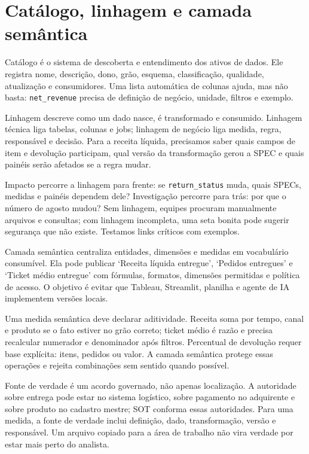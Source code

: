 \section{Catálogo, linhagem e camada semântica}

Catálogo é o sistema de descoberta e entendimento dos ativos de dados. Ele registra nome, descrição, dono, grão, esquema, classificação, qualidade, atualização e consumidores. Uma lista automática de colunas ajuda, mas não basta: \texttt{net\_revenue} precisa de definição de negócio, unidade, filtros e exemplo.

Linhagem descreve como um dado nasce, é transformado e consumido. Linhagem técnica liga tabelas, colunas e jobs; linhagem de negócio liga medida, regra, responsável e decisão. Para a receita líquida, precisamos saber quais campos de item e devolução participam, qual versão da transformação gerou a SPEC e quais painéis serão afetados se a regra mudar.

Impacto percorre a linhagem para frente: se \texttt{return\_status} muda, quais SPECs, medidas e painéis dependem dele? Investigação percorre para trás: por que o número de agosto mudou? Sem linhagem, equipes procuram manualmente arquivos e consultas; com linhagem incompleta, uma seta bonita pode sugerir segurança que não existe. Testamos links críticos com exemplos.

Camada semântica centraliza entidades, dimensões e medidas em vocabulário consumível. Ela pode publicar `Receita líquida entregue', `Pedidos entregues' e `Ticket médio entregue' com fórmulas, formatos, dimensões permitidas e política de acesso. O objetivo é evitar que Tableau, Streamlit, planilha e agente de IA implementem versões locais.

Uma medida semântica deve declarar aditividade. Receita soma por tempo, canal e produto se o fato estiver no grão correto; ticket médio é razão e precisa recalcular numerador e denominador após filtros. Percentual de devolução requer base explícita: itens, pedidos ou valor. A camada semântica protege essas operações e rejeita combinações sem sentido quando possível.

Fonte de verdade é um acordo governado, não apenas localização. A autoridade sobre entrega pode estar no sistema logístico, sobre pagamento no adquirente e sobre produto no cadastro mestre; SOT conforma essas autoridades. Para uma medida, a fonte de verdade inclui definição, dado, transformação, versão e responsável. Um arquivo copiado para a área de trabalho não vira verdade por estar mais perto do analista.

